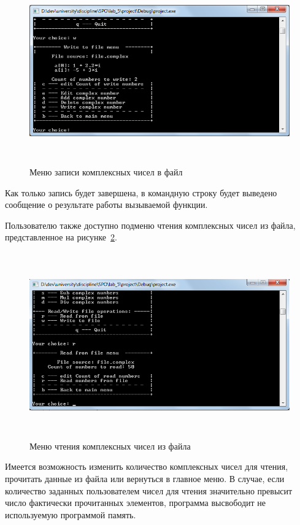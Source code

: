 \begin{figure}[htbp]
  \centering
  \includegraphics[width=150mm,height=80mm]{img/write_menu}
  \caption{Меню записи комплексных чисел в файл}\label{fig:write_menu}
\end{figure}

Как только запись будет завершена, в командную строку будет выведено сообщение о результате работы вызываемой функции.

Пользователю также доступно подменю чтения комплексных чисел из файла, представленное на рисунке~\ref{fig:read_menu}.

\begin{figure}[htbp]
  \centering
  \includegraphics[width=150mm,height=80mm]{img/read_menu}
  \caption{Меню чтения комплексных чисел из файла}\label{fig:read_menu}
\end{figure}

 Имеется возможность изменить количество комплексных чисел для чтения, прочитать данные из файла или вернуться в главное меню. В случае, если количество заданных пользователем чисел для чтения значительно превысит число фактически прочитанных элементов, программа высвободит не используемую программой память.

